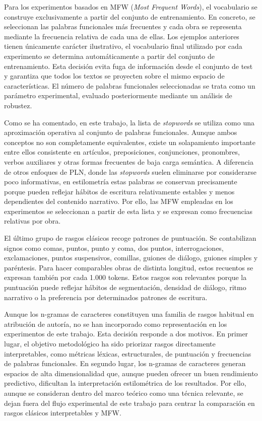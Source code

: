 \documentclass[IB]{TFUOC}%
\begin{document}
Para los experimentos basados en MFW (\textit{Most Frequent Words}), el vocabulario se construye exclusivamente a partir del conjunto de entrenamiento. En concreto, se seleccionan las palabras funcionales más frecuentes y cada obra se representa mediante la frecuencia relativa de cada una de ellas. Los ejemplos anteriores tienen únicamente carácter ilustrativo, el vocabulario final utilizado por cada experimento se determina automáticamente a partir del conjunto de entrenamiento. Esta decisión evita fuga de información desde el conjunto de test y garantiza que todos los textos se proyecten sobre el mismo espacio de características. El número de palabras funcionales seleccionadas se trata como un parámetro experimental, evaluado posteriormente mediante un análisis de robustez.

Como se ha comentado, en este trabajo, la lista de \textit{stopwords} se utiliza como una aproximación operativa al conjunto de palabras funcionales. Aunque ambos conceptos no son completamente equivalentes, existe un solapamiento importante entre ellos consistente en artículos, preposiciones, conjunciones, pronombres, verbos auxiliares y otras formas frecuentes de baja carga semántica. A diferencia de otros enfoques de PLN, donde las \textit{stopwords} suelen eliminarse por considerarse poco informativas, en estilometría estas palabras se conservan precisamente porque pueden reflejar hábitos de escritura relativamente estables y menos dependientes del contenido narrativo. Por ello, las MFW empleadas en los experimentos se seleccionan a partir de esta lista y se expresan como frecuencias relativas por obra.

El último grupo de rasgos clásicos recoge patrones de puntuación. Se contabilizan signos como comas, puntos, punto y coma, dos puntos, interrogaciones, exclamaciones, puntos suspensivos, comillas, guiones de diálogo, guiones simples y paréntesis. Para hacer comparables obras de distinta longitud, estos recuentos se expresan también por cada 1.000 tokens. Estos rasgos son relevantes porque la puntuación puede reflejar hábitos de segmentación, densidad de diálogo, ritmo narrativo o la preferencia por determinados patrones de escritura.

Aunque los n-gramas de caracteres constituyen una familia de rasgos habitual en atribución de autoría, no se han incorporado como representación en los experimentos de este trabajo. Esta decisión responde a dos motivos. En primer lugar, el objetivo metodológico ha sido priorizar rasgos directamente interpretables, como métricas léxicas, estructurales, de puntuación y frecuencias de palabras funcionales. En segundo lugar, los n-gramas de caracteres generan espacios de alta dimensionalidad que, aunque pueden ofrecer un buen rendimiento predictivo, dificultan la interpretación estilométrica de los resultados. Por ello, aunque se consideran dentro del marco teórico como una técnica relevante, se dejan fuera del flujo experimental de este trabajo para centrar la comparación en rasgos clásicos interpretables y MFW.
\end{document}
